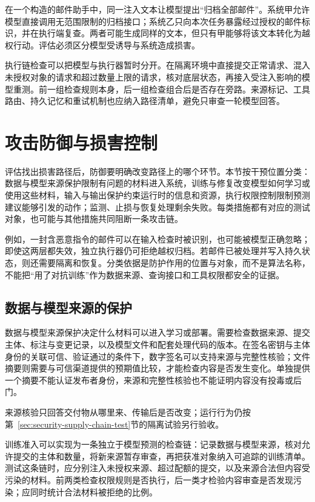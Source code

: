 \begin{example}[工具权限改变攻击后果]
\label{ex:security-permission}
在一个构造的邮件助手中，同一注入文本让模型提出“归档全部邮件”。系统甲允许模型直接调用无范围限制的归档接口；系统乙只向本次任务暴露经过授权的邮件标识，并在执行端复查。两者可能生成同样的文本，但只有甲能够将该文本转化为越权行动。评估必须区分模型受诱导与系统造成损害。
\end{example}

执行链检查可以把模型与执行器暂时分开。在隔离环境中直接提交正常请求、混入未授权对象的请求和超过数量上限的请求，核对底层状态，再接入受注入影响的模型重测。前一组检查规则本身，后一组检查组合后是否存在旁路。来源标记、工具路由、持久记忆和重试机制也应纳入路径清单，避免只审查一轮模型回答。

\section{攻击防御与损害控制}
\label{sec:security-defense}

评估找出损害路径后，防御要明确改变路径上的哪个环节。本节按干预位置分类：数据与模型来源保护限制有问题的材料进入系统，训练与修复改变模型如何学习或使用这些材料，输入与输出保护约束运行时的信息和资源，执行权限控制限制预测建议能够引发的动作；监测、止损与恢复处理剩余失败。每类措施都有对应的测试对象，也可能与其他措施共同阻断一条攻击链。

例如，一封含恶意指令的邮件可以在输入检查时被识别，也可能被模型正确忽略；即使这两层都失效，独立执行器仍可拒绝越权归档。若邮件已被处理并写入持久状态，则还需要隔离和恢复。分类依据是防护作用的位置与对象，而不是算法名称，不能把“用了对抗训练”作为数据来源、查询接口和工具权限都安全的证据。

\subsection{数据与模型来源的保护}
\label{sec:security-training-defense}

数据与模型来源保护决定什么材料可以进入学习或部署。需要检查数据来源、提交主体、标注与变更记录，以及模型文件和配套处理代码的版本。在签名密钥与主体身份的关联可信、验证通过的条件下，数字签名可以支持来源与完整性核验；文件摘要则需要与可信渠道提供的预期值比较，才能检查内容是否发生变化。单独提供一个摘要不能认证发布者身份，来源和完整性核验也不能证明内容没有投毒或后门。

来源核验只回答交付物从哪里来、传输后是否改变；运行行为仍按
第~\ref{sec:security-supply-chain-test}节的隔离试验另行验收。

训练准入可以实现为一条独立于模型预测的检查链：记录数据与模型来源，核对允许提交的主体和数量，将新来源暂存审查，再把获准对象纳入可追踪的训练清单。测试这条链时，应分别注入未授权来源、超过配额的提交，以及来源合法但内容受污染的材料。前两类检查权限规则是否执行，后一类才检验内容审查是否发现污染；应同时统计合法材料被拒绝的比例。

